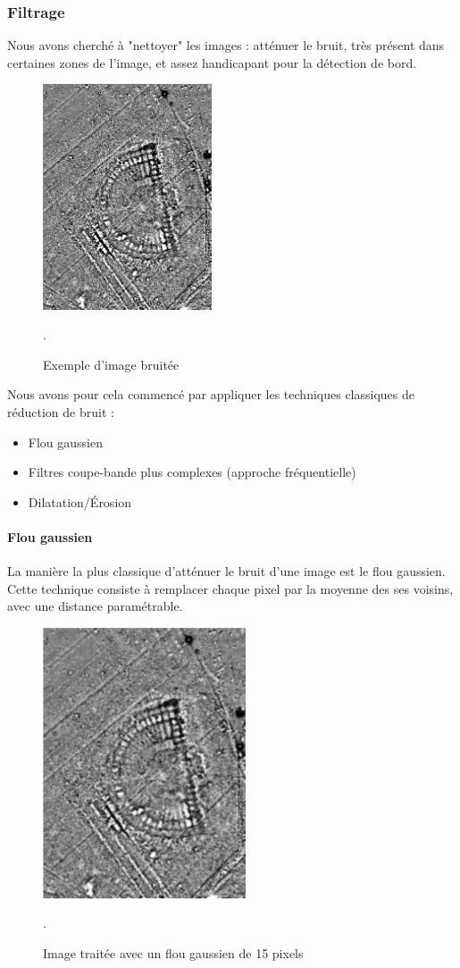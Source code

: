 \documentclass[a4paper, 12pt, titlepage, oneside, french]{article}
\begin{document}
	\subsubsection{Filtrage}
	Nous avons cherché à "nettoyer" les images : atténuer le bruit, très présent dans certaines zones de l'image, et assez handicapant pour la détection de bord.
	\begin{figure}[H]
		\centering
		\includegraphics[width=5cm]{filter_input.png}
		\caption{Exemple d'image bruitée}. 
		\label{fig:FilterInput}
	\end{figure}
	Nous avons pour cela commencé par appliquer les techniques classiques de réduction de bruit : 
	\begin{itemize}
		\item Flou gaussien
		\item Filtres coupe-bande plus complexes (approche fréquentielle)
		\item Dilatation/Érosion
	\end{itemize}
	\newpage
	\paragraph{\textbf{Flou gaussien}}
	La manière la plus classique d'atténuer le bruit d'une image est le flou gaussien. Cette technique consiste à remplacer chaque pixel par la moyenne des ses voisins, avec une distance paramétrable.
	\begin{figure}[H]
		\centering
		\includegraphics[width=6cm]{filter_gaussian.png}
		\caption{Image traitée avec un flou gaussien de 15 pixels}. 
		\label{fig:FilterGaussian}
	\end{figure}
\end{document}
